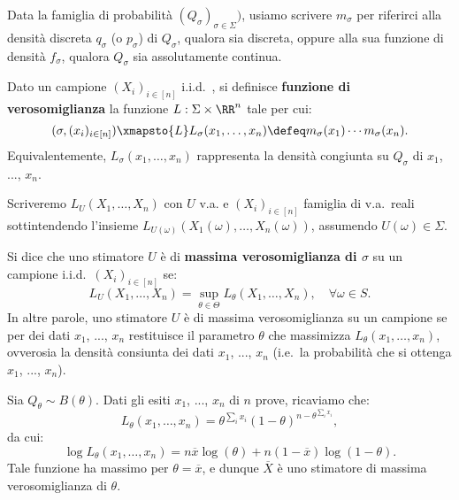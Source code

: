 \begin{multicols*}{2}
\begin{notation}
    Data la famiglia di probabilità $(Q_\sigma)_{\sigma \in \Sigma})$, usiamo
    scrivere $m_\sigma$ per riferirci alla densità discreta $q_\sigma$ (o $p_\sigma$)
    di $Q_\sigma$, qualora sia discreta, oppure alla sua funzione di densità
    $f_\sigma$, qualora $Q_\sigma$ sia assolutamente continua.
\end{notation}

\begin{definition}
    Dato un campione $(X_i)_{i \in [n]}$ i.i.d.~, si definisce
    \textbf{funzione di verosomiglianza} la funzione $L : \Sigma \times \RR^n$
    tale per cui:
    \[
        (\sigma, (x_i)_{i \in [n]}) \xmapsto{L} L_\sigma(x_1, \ldots, x_n) \defeq m_\sigma(x_1) \cdots m_\sigma(x_n).
    \]
    Equivalentemente, $L_\sigma(x_1, \ldots, x_n)$ rappresenta la densità congiunta su $Q_\sigma$
    di $x_1$, ..., $x_n$.
\end{definition}

\begin{notation}
    Scriveremo $L_U(X_1, \ldots, X_n)$ con $U$ v.a. e
    $(X_i)_{i \in [n]}$ famiglia di v.a.~reali sottintendendo
    l'insieme $L_{U(\omega)}(X_1(\omega), \ldots, X_n(\omega))$,
    assumendo $U(\omega) \in \Sigma$.
\end{notation}

\begin{definition}
    Si dice che uno stimatore $U$ è di \textbf{massima verosomiglianza di $\sigma$}
    su un campione i.i.d.~$(X_i)_{i \in [n]}$ se:
    \[
        L_U(X_1, \ldots, X_n) = \sup_{\theta \in \Theta} L_\theta(X_1, \ldots, X_n), \quad \forall \omega \in S.
    \]
    In altre parole, uno stimatore $U$ è di massima verosomiglianza su un campione se
    per dei dati $x_1$, ..., $x_n$ restituisce il parametro $\theta$ che massimizza
    $L_\theta(x_1, \ldots, x_n)$, ovverosia la densità consiunta dei dati
    $x_1$, ..., $x_n$ (i.e.~la probabilità che si ottenga $x_1$, ..., $x_n$).
\end{definition}

\begin{example}
    Sia $Q_\theta \sim B(\theta)$. Dati gli esiti $x_1$, ..., $x_n$ di $n$ prove,
    ricaviamo che:
    \[
        L_\theta(x_1, \ldots, x_n) = \theta^{\sum_i x_i} (1 - \theta)^{n - \theta^{\sum_i x_i}},
    \]
    da cui:
    \[
        \log L_\theta(x_1, \ldots, x_n) = n \overline{x} \log(\theta) + n (1 - \overline{x}) \log(1 - \theta).
    \]
    Tale funzione ha massimo per $\theta = \overline{x}$, e dunque
    $\overline{X}$ è uno stimatore di massima verosomiglianza di $\theta$. \smallskip


\end{example}
\end{multicols*}

